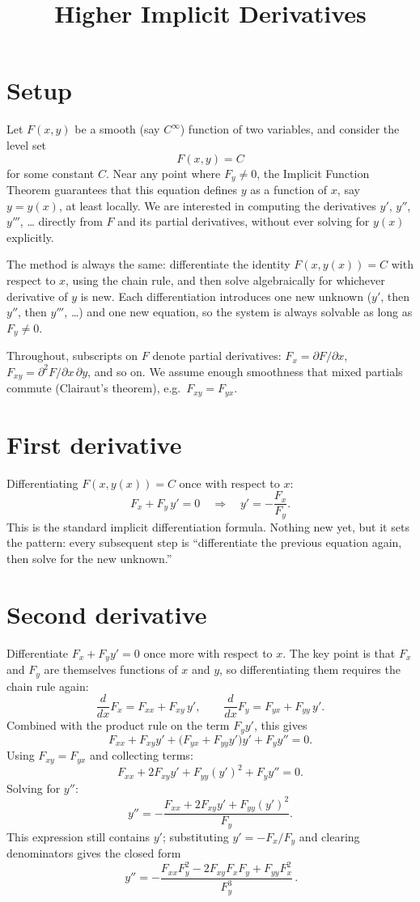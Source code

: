 \documentclass{essay}
\title{Higher Implicit Derivatives}
\author{}
\date{}
\begin{document}
\maketitle

\section{Setup}

Let $F(x,y)$ be a smooth (say $C^\infty$) function of two variables, and consider the level
set
\[ F(x,y) = C \]
for some constant $C$. Near any point where $F_y \neq 0$, the Implicit Function Theorem
guarantees that this equation defines $y$ as a function of $x$, say $y = y(x)$, at least
locally. We are interested in computing the derivatives $y'$, $y''$, $y'''$, \dots{} directly
from $F$ and its partial derivatives, without ever solving for $y(x)$ explicitly.

The method is always the same: differentiate the identity $F(x,y(x)) = C$ with respect to
$x$, using the chain rule, and then solve algebraically for whichever derivative of $y$ is
new. Each differentiation introduces one new unknown ($y'$, then $y''$, then $y'''$, \dots{})
and one new equation, so the system is always solvable as long as $F_y \neq 0$.

Throughout, subscripts on $F$ denote partial derivatives: $F_x = \partial F/\partial x$,
$F_{xy} = \partial^2 F/\partial x\, \partial y$, and so on. We assume enough smoothness that
mixed partials commute (Clairaut's theorem), e.g.\ $F_{xy} = F_{yx}$.

\section{First derivative}

Differentiating $F(x,y(x)) = C$ once with respect to $x$:
\[
  F_x + F_y\, y' = 0
  \quad\Longrightarrow\quad
  y' = -\frac{F_x}{F_y}.
\]
This is the standard implicit differentiation formula. Nothing new yet, but it sets the
pattern: every subsequent step is ``differentiate the previous equation again, then solve
for the new unknown.''

\section{Second derivative}

Differentiate $F_x + F_y y' = 0$ once more with respect to $x$. The key point is that $F_x$
and $F_y$ are themselves functions of $x$ and $y$, so differentiating them requires the
chain rule again:
\[
  \frac{d}{dx}F_x = F_{xx} + F_{xy}\,y', \qquad
  \frac{d}{dx}F_y = F_{yx} + F_{yy}\,y'.
\]
Combined with the product rule on the term $F_y y'$, this gives
\[
  F_{xx} + F_{xy}y' + \big(F_{yx} + F_{yy}y'\big)y' + F_y y'' = 0.
\]
Using $F_{xy} = F_{yx}$ and collecting terms:
\[
  F_{xx} + 2F_{xy}y' + F_{yy}(y')^2 + F_y y'' = 0.
\]
Solving for $y''$:
\[
  y'' = -\frac{F_{xx} + 2F_{xy}y' + F_{yy}(y')^2}{F_y}.
\]
This expression still contains $y'$; substituting $y' = -F_x/F_y$ and clearing denominators
gives the closed form
\[
  \boxed{\,y'' = -\dfrac{F_{xx}F_y^2 - 2F_{xy}F_xF_y + F_{yy}F_x^2}{F_y^3}\,}.
\]
\end{document}

